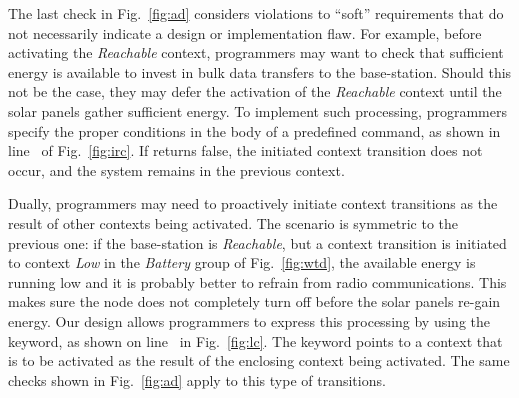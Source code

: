 The last check in Fig.~\ref{fig:ad} considers violations to ``soft''
requirements that do not necessarily indicate a design or
implementation flaw.  For example, before activating the
\emph{Reachable} context, programmers may want to check that
sufficient energy is available to invest in bulk data transfers to the
base-station. Should this not be the case, they may defer the
activation of the \emph{Reachable} context until the solar panels
gather sufficient energy. To implement such processing, \conesc
programmers specify the proper conditions in the body of a predefined
 command, as shown in line~ of
Fig.~\ref{fig:irc}. If  returns false, the initiated
context transition does not occur, and the system remains in the
previous context.


Dually, programmers may need to proactively initiate context
transitions as the result of other contexts being activated. The
scenario is symmetric to the previous one: if the base-station is
\emph{Reachable}, but a context transition is initiated to context
\emph{Low} in the \emph{Battery} group of Fig.~\ref{fig:wtd}, the
available energy is running low and it is probably better to refrain
from radio communications. This makes sure the node does not
completely turn off before the solar panels re-gain energy. Our design
allows programmers to express this processing by using the
 keyword, as shown on line~ in
Fig.~\ref{fig:lc}. The  keyword points to a context
that is to be activated as the result of the enclosing context being
activated. The same checks shown in Fig.~\ref{fig:ad} apply to this
type of transitions.





